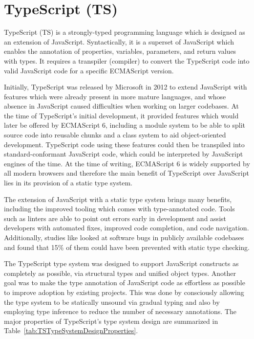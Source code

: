 \section{TypeScript (TS)}
\label{sec:TS}

TypeScript (TS) is a strongly-typed programming language which is
designed as an extension of JavaScript. Syntactically, it is a
superset of JavaScript which enables the annotation of properties,
variables, parameters, and return values with types. It requires a
transpiler (compiler) to convert the TypeScript code into valid
JavaScript code for a specific ECMAScript version.

Initially, TypeScript was released by Microsoft in 2012
\parencite{TSFirstRelease} to extend JavaScript with features which
were already present in more mature languages, and whose absence in
JavaScript caused difficulties when working on larger codebases. At
the time of TypeScript's initial development, it provided features
which would later be offered by ECMAScript 6, including a module
system to be able to split source code into reusable chunks and a
class system to aid object-oriented development. TypeScript code using
these features could then be transpiled into standard-conformant
JavaScript code, which could be interpreted by JavaScript engines of
the time. At the time of writing, ECMAScript 6 is widely supported by
all modern browsers and therefore the main benefit of TypeScript over
JavaScript lies in its provision of a static type system.

The extension of JavaScript with a static type system brings many
benefits, including the improved tooling which comes with
type-annotated code. Tools such as linters \parencite{ESLint} are able
to point out errors early in development and assist developers with
automated fixes, improved code completion, and code navigation.
Additionally, studies like \textcite{ToTypeOrNotToType} looked at
software bugs in publicly available codebases and found that 15\% of
them could have been prevented with static type checking.

The TypeScript type system was designed to support JavaScript
constructs as completely as possible, via structural types and unified
object types. Another goal was to make the type annotation of
JavaScript code as effortless as possible to improve adoption by
existing projects. This was done by consciously allowing the type
system to be statically unsound via gradual typing and also by
employing type inference to reduce the number of necessary
annotations. The major properties of TypeScript's type system design
are summarized in Table~\ref{tab:TSTypeSystemDesignProperties}.


